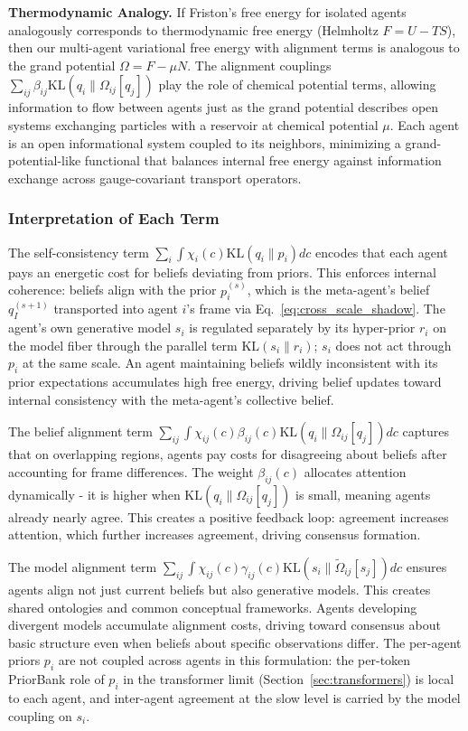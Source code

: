 \documentclass[11pt]{article}
\begin{document}
\textbf{Thermodynamic Analogy.} If Friston's free energy for isolated agents analogously corresponds to thermodynamic free energy (Helmholtz $F = U - TS$), then our multi-agent variational free energy with alignment terms is analogous to the grand potential $\Omega = F - \mu N$. The alignment couplings $\sum_{ij} \beta_{ij} \mathrm{KL}(q_i \| \Omega_{ij}[q_j])$ play the role of chemical potential terms, allowing information to flow between agents just as the grand potential describes open systems exchanging particles with a reservoir at chemical potential $\mu$. Each agent is an open informational system coupled to its neighbors, minimizing a grand-potential-like functional that balances internal free energy against information exchange across gauge-covariant transport operators.

\subsubsection{Interpretation of Each Term}

The self-consistency term $\sum_i \int \chi_i(c)  \mathrm{KL}(q_i \| p_i)  dc$ encodes that each agent pays an energetic cost for beliefs deviating from priors. This enforces internal coherence: beliefs align with the prior $p_i^{(s)}$, which is the meta-agent's belief $q_I^{(s+1)}$ transported into agent $i$'s frame via Eq.~\eqref{eq:cross_scale_shadow}. The agent's own generative model $s_i$ is regulated separately by its hyper-prior $r_i$ on the model fiber through the parallel term $\mathrm{KL}(s_i\|r_i)$; $s_i$ does not act through $p_i$ at the same scale. An agent maintaining beliefs wildly inconsistent with its prior expectations accumulates high free energy, driving belief updates toward internal consistency with the meta-agent's collective belief.

The belief alignment term $\sum_{ij} \int \chi_{ij}(c)  \beta_{ij}(c)  \mathrm{KL}(q_i \| \Omega_{ij}[q_j])  dc$ captures that on overlapping regions, agents pay costs for disagreeing about beliefs after accounting for frame differences. The weight $\beta_{ij}(c)$ allocates attention dynamically - it is higher when $\mathrm{KL}(q_i \| \Omega_{ij}[q_j])$ is small, meaning agents already nearly agree. This creates a positive feedback loop: agreement increases attention, which further increases agreement, driving consensus formation.

The model alignment term $\sum_{ij} \int \chi_{ij}(c)  \gamma_{ij}(c)  \mathrm{KL}(s_i \| \tilde{\Omega}_{ij}[s_j])  dc$ ensures agents align not just current beliefs but also generative models. This creates shared ontologies and common conceptual frameworks. Agents developing divergent models accumulate alignment costs, driving toward consensus about basic structure even when beliefs about specific observations differ. The per-agent priors $p_i$ are not coupled across agents in this formulation: the per-token PriorBank role of $p_i$ in the transformer limit (Section~\ref{sec:transformers}) is local to each agent, and inter-agent agreement at the slow level is carried by the model coupling on $s_i$.
\end{document}
